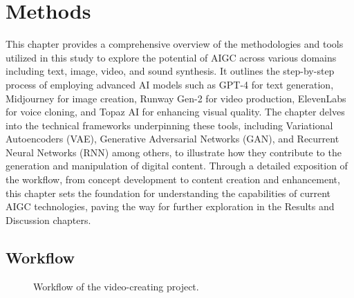 \documentclass[11pt,a4paper,oneside]{report}
\begin{document}
\chapter{Methods}

This chapter provides a comprehensive overview of the methodologies and tools utilized in this study to explore the potential of AIGC across various domains including text, image, video, and sound synthesis. 
It outlines the step-by-step process of employing advanced AI models such as GPT-4 for text generation, Midjourney for image creation, Runway Gen-2 for video production, ElevenLabs for voice cloning, and Topaz AI for enhancing visual quality. 
The chapter delves into the technical frameworks underpinning these tools, including Variational Autoencoders (VAE), Generative Adversarial Networks (GAN), and Recurrent Neural Networks (RNN) among others, to illustrate how they contribute to the generation and manipulation of digital content. 
Through a detailed exposition of the workflow, from concept development to content creation and enhancement, this chapter sets the foundation for understanding the capabilities of current AIGC technologies, paving the way for further exploration in the Results and Discussion chapters.

\section{Workflow}

\begin{figure}[H]
\centering
{}
\caption{Workflow of the video-creating project.}
\end{figure}
\end{document}
